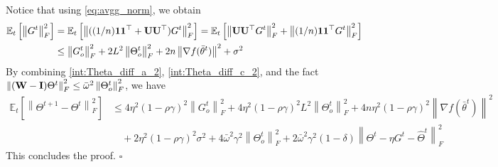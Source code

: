 \documentclass[10pt]{article} %
\theoremstyle{plain}
\theoremstyle{definition}
\theoremstyle{remark}
\newcommand{\prm}{\theta}
\newcommand{\bw}{\bar{\omega}}
\newcommand{\avgtheta}{\bar{\prm}}
\newcommand{\norm}[1]{\left\| #1 \right\|}
\newcommand{\nl}{\nonumber\\}
\newcommand{\W}{{\bf W}}
\newcommand{\U}{{\bf U}}
\newcommand{\I}{{\bf I}}
\begin{document}
Notice that using \eqref{eq:avgg_norm}, we obtain
\begin{align}
    \mathbb{E}_t \left[ \norm{G^t}_F^2 \right] & = \mathbb{E}_t \left[ \norm{ ( (1/n) {\bf 11}^\top + \U\U^\top ) G^t }_F^2 \right] = \mathbb{E}_t \left[ \norm{  \U\U^\top G^t }_F^2 + \norm{ (1/n){\bf 11}^\top G^t }_F^2 \right]
    \nl & \leq \norm{G_o^t}_F^2 + 2L^2\norm{\Theta_o^t}_F^2 + 2 n  \norm{\nabla f(\avgtheta^t)}^2 + \sigma^2 \label{int:Theta_diff_c_2}
\end{align}
By combining \eqref{int:Theta_diff_a_2}, \eqref{int:Theta_diff_c_2}, and the fact $\norm{ (\W-\I)\Theta^t}_F^2 \leq \bw^2 \norm{\Theta_o^t}_F^2$, we have
\begin{align*}
    \mathbb{E}_t \left[ \norm{\Theta^{t+1} - \Theta^t}_F^2 \right] &\leq 4 \eta^2(1-\rho\gamma)^2\norm{G_o^t}_F^2 + 4 \eta^2(1-\rho\gamma)^2L^2 \norm{\Theta_o^t}_F^2 + 4 n  \eta^2(1-\rho\gamma)^2 \norm{\nabla f(\avgtheta^t)}^2
    \\ &\quad + 2 \eta^2(1-\rho\gamma)^2\sigma^2 + 4 \bw^2  \gamma^2\norm{\Theta_o^t}_F^2 + 2 \bw^2 \gamma^2(1-\delta)\norm{\Theta^t - \eta G^t - \hat{\Theta}^t}_F^2
\end{align*}
This concludes the proof. \hfill $\square$
\end{document}
